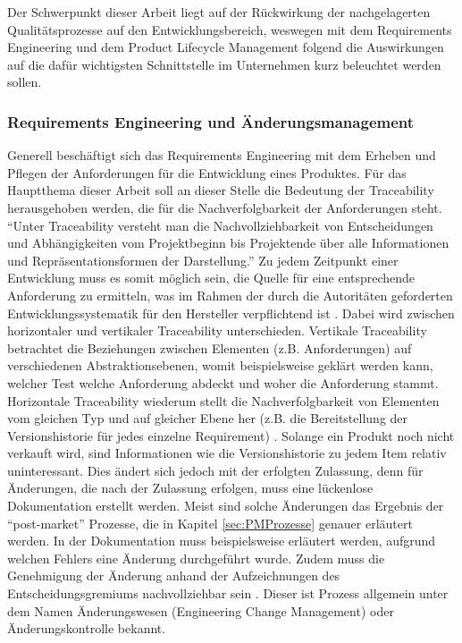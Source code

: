\documentclass[a4paper,12pt]{report}
\begin{document}
Der Schwerpunkt dieser Arbeit liegt auf der Rückwirkung der nachgelagerten Qualitätsprozesse auf den Entwicklungsbereich, weswegen mit dem Requirements Engineering und dem Product Lifecycle Management folgend die Auswirkungen auf die dafür wichtigsten Schnittstelle im Unternehmen kurz beleuchtet werden sollen.
\subsubsection{Requirements Engineering und Änderungsmanagement}
Generell beschäftigt sich das Requirements Engineering mit dem Erheben und Pflegen der Anforderungen für die Entwicklung eines Produktes. Für das Hauptthema dieser Arbeit soll an dieser Stelle die Bedeutung der Traceability herausgehoben werden, die für die Nachverfolgbarkeit der Anforderungen steht. "`Unter Traceability versteht man die Nachvollziehbarkeit von Entscheidungen und Abhängigkeiten vom Projektbeginn bis Projektende über alle Informationen und Repräsentationsformen der Darstellung."'\citep[][S. 407]{Rupp2002} Zu jedem Zeitpunkt einer Entwicklung muss es somit möglich sein, die Quelle für eine entsprechende Anforderung zu ermitteln, was im Rahmen der durch die Autoritäten geforderten Entwicklungssystematik für den Hersteller verpflichtend ist \citep[vgl.][S. 117]{Johner2015}. Dabei wird zwischen horizontaler und vertikaler Traceability unterschieden. Vertikale Traceability betrachtet die Beziehungen zwischen Elementen (z.B. Anforderungen) auf verschiedenen Abstraktionsebenen, womit beispielsweise geklärt werden kann, welcher Test welche Anforderung abdeckt und woher die Anforderung stammt. Horizontale Traceability wiederum stellt die Nachverfolgbarkeit von Elementen vom gleichen Typ und auf gleicher Ebene her (z.B. die Bereitstellung der Versionshistorie für jedes einzelne Requirement) \citep[vgl.][]{Ebert2014}. Solange ein Produkt noch nicht verkauft wird, sind Informationen wie die Versionshistorie zu jedem Item relativ uninteressant. Dies ändert sich jedoch mit der erfolgten Zulassung, denn für Änderungen, die nach der Zulassung erfolgen, muss eine lückenlose Dokumentation erstellt werden. Meist sind solche Änderungen das Ergebnis der "`post-market"' Prozesse, die in Kapitel \ref{sec:PMProzesse} genauer erläutert werden. In der Dokumentation muss beispielsweise erläutert werden, aufgrund welchen Fehlers eine Änderung durchgeführt wurde. Zudem muss die Genehmigung der Änderung anhand der Aufzeichnungen des Entscheidungsgremiums nachvollziehbar sein \citep[vgl.][S. 145f.]{Johner2015}. Dieser ist Prozess allgemein unter dem Namen Änderungswesen (Engineering Change Management) oder Änderungskontrolle bekannt.
\end{document}
